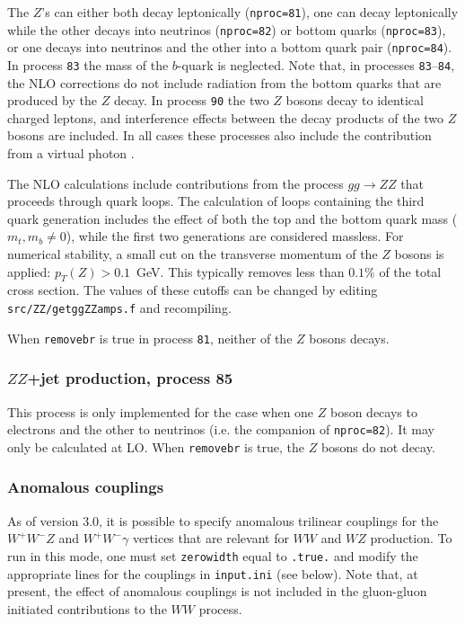 The $Z$'s can either both decay leptonically ({\tt nproc=81}),
one can decay leptonically while the other decays into neutrinos
({\tt nproc=82}) or bottom quarks ({\tt nproc=83}), or
one decays into neutrinos and the other into a bottom quark pair
({\tt nproc=84}).
In process {\tt 83} the mass of the $b$-quark is neglected. Note that, in processes
{\tt 83}--{\tt 84}, the NLO corrections do not include
radiation from the bottom quarks that are produced by the $Z$ decay.
In process {\tt 90} the two $Z$ bosons decay to identical charged leptons,
and interference effects between the decay products of the two $Z$ bosons
are included.
In all cases these processes also include the contribution from a virtual photon .

The NLO calculations include contributions from the process $gg \to ZZ$
that proceeds through quark loops. The calculation of loops containing the third quark generation
includes the effect of both the top and the bottom quark mass ($m_t,m_b \neq 0$), while the first two
generations are considered massless. For numerical stability, a small cut on the
transverse momentum of the $Z$ bosons is applied: $p_T(Z)>0.1$~GeV.
This typically removes less than $0.1$\% of the total cross section. The
values of these cutoffs can be changed by editing {\tt src/ZZ/getggZZamps.f} 
and recompiling.

When {\tt removebr} is true in process {\tt 81}, neither of the $Z$ bosons decays.


\subsubsection{$ZZ$+jet production, process 85}

This process is only implemented for the case when one $Z$ boson decays to
electrons and the other to neutrinos (i.e. the companion of {\tt nproc=82}).
It may only be calculated at LO. When {\tt removebr} is true, the $Z$ bosons
do not decay.

\subsubsection{Anomalous couplings}

\label{sec:anomalous}
As of version 3.0, it is possible to specify anomalous trilinear
couplings for the $W^+W^-Z$ and $W^+W^-\gamma$ vertices that are
relevant for $WW$ and $WZ$ production. To run in this mode, one
must set {\tt zerowidth} equal to {\tt .true.}
and modify the appropriate lines for the couplings in {\tt input.ini}
(see below). Note that, at present, the effect of anomalous couplings is not included
in the gluon-gluon initiated contributions to the $WW$ process.


